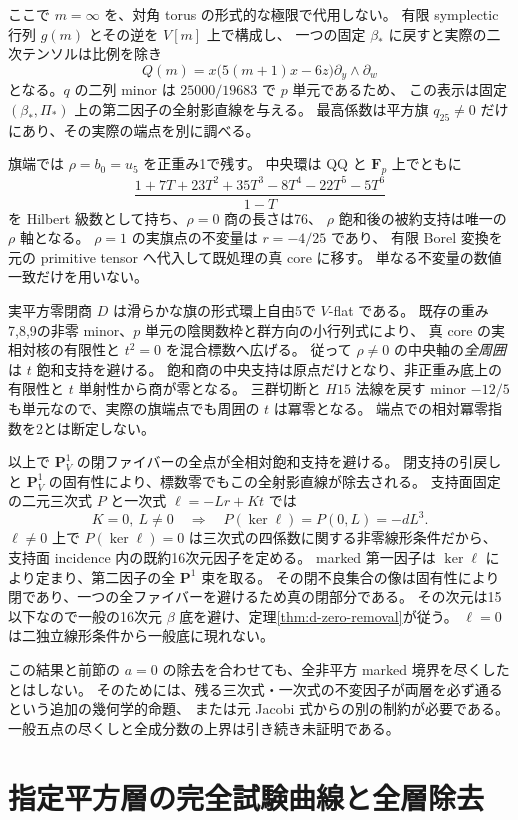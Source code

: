 \documentclass[11pt,a4paper]{ltjsarticle}
\newcommand{\PP}{\mathbf P}
\theoremstyle{remark}
\begin{document}
ここで $m=\infty$ を、対角 torus の形式的な極限で代用しない。
有限 symplectic 行列 $g(m)$ とその逆を $V[m]$ 上で構成し、
一つの固定 $\beta_*$ に戻すと実際の二次テンソルは比例を除き
\[
 Q(m)=x\bigl(5(m+1)x-6z\bigr)\partial_y\wedge\partial_w
\]
となる。$q$ の二列 minor は $25000/19683$ で $p$ 単元であるため、
この表示は固定 $(\beta_*,\Pi_*)$ 上の第二因子の全射影直線を与える\cite{d-zero-geometry-v61}。
最高係数は平方旗 $q_{25}\ne0$ だけにあり、その実際の端点を別に調べる。

旗端では $\rho=b_0=u_5$ を正重み1で残す。
中央環は QQ と $\mathbf F_p$ 上でともに
\[
 \frac{1+7T+23T^2+35T^3-8T^4-22T^5-5T^6}{1-T}
\]
を Hilbert 級数として持ち、$\rho=0$ 商の長さは76、
$\rho$ 飽和後の被約支持は唯一の $\rho$ 軸となる。
$\rho=1$ の実旗点の不変量は $r=-4/25$ であり、
有限 Borel 変換を元の primitive tensor へ代入して既処理の真 core に移す。
単なる不変量の数値一致だけを用いない。

実平方零閉商 $D$ は滑らかな旗の形式環上自由5で $V$-flat である。
既存の重み7,8,9の非零 minor、$p$ 単元の陰関数枠と群方向の小行列式により、
真 core の実相対核の有限性と $t^2=0$ を混合標数へ広げる。
従って $\rho\ne0$ の中央軸の\emph{全周囲}は $t$ 飽和支持を避ける。
飽和商の中央支持は原点だけとなり、非正重み底上の有限性と $t$ 単射性から商が零となる。
三群切断と $H15$ 法線を戻す minor $-12/5$ も単元なので、実際の旗端点でも周囲の $t$ は冪零となる。
端点での相対冪零指数を2とは断定しない。

以上で $\PP^1_V$ の閉ファイバーの全点が全相対飽和支持を避ける。
閉支持の引戻しと $\PP^1_V$ の固有性により、標数零でもこの全射影直線が除去される。
支持面固定の二元三次式 $P$ と一次式 $\ell=-Lr+Kt$ では
\[
 K=0,\ L\ne0\quad\Longrightarrow\quad P(\ker\ell)=P(0,L)=-dL^3.
\]
$\ell\ne0$ 上で $P(\ker\ell)=0$ は三次式の四係数に関する非零線形条件だから、
支持面 incidence 内の既約16次元因子を定める。
marked 第一因子は $\ker\ell$ により定まり、第二因子の全 $\PP^1$ 束を取る。
その閉不良集合の像は固有性により閉であり、一つの全ファイバーを避けるため真の閉部分である。
その次元は15以下なので一般の16次元 $\beta$ 底を避け、定理\ref{thm:d-zero-removal}が従う。
$\ell=0$ は二独立線形条件から一般底に現れない。

この結果と前節の $a=0$ の除去を合わせても、全非平方 marked 境界を尽くしたとはしない。
そのためには、残る三次式・一次式の不変因子が両層を必ず通るという追加の幾何学的命題、
または元 Jacobi 式からの別の制約が必要である。
一般五点の尽くしと全成分数の上界は引き続き未証明である。

\section{指定平方層の完全試験曲線と全層除去}\label{sec:sigma-full-v62}
\end{document}
